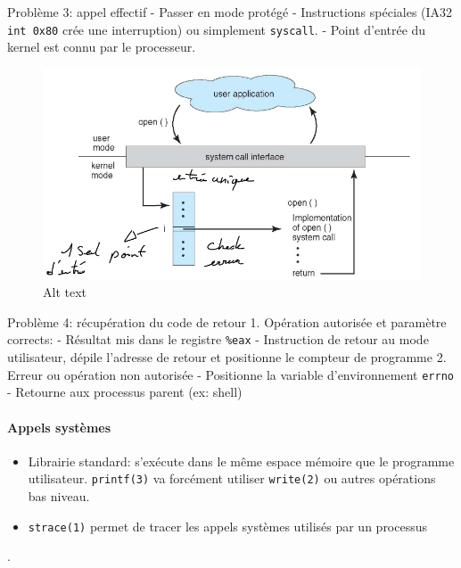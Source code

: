 Problème 3: appel effectif - Passer en mode protégé - Instructions
spéciales (IA32 \texttt{int\ 0x80} crée une interruption) ou simplement
\texttt{syscall}. - Point d'entrée du kernel est connu par le
processeur.

\begin{figure}
\centering
\includegraphics{image-13.png}
\caption{Alt text}
\end{figure}

Problème 4: récupération du code de retour 1. Opération autorisée et
paramètre corrects: - Résultat mis dans le registre \texttt{\%eax} -
Instruction de retour au mode utilisateur, dépile l'adresse de retour et
positionne le compteur de programme 2. Erreur ou opération non autorisée
- Positionne la variable d'environnement \texttt{errno} - Retourne aux
processus parent (ex: shell)

\paragraph{Appels systèmes}\label{appels-systuxe8mes}

\begin{itemize}
\tightlist
\item
  Librairie standard: s'exécute dans le même espace mémoire que le
  programme utilisateur. \texttt{printf(3)} va forcément utiliser
  \texttt{write(2)} ou autres opérations bas niveau.
\item
  \texttt{strace(1)} permet de tracer les appels systèmes utilisés par
  un processus
\end{itemize}

.

